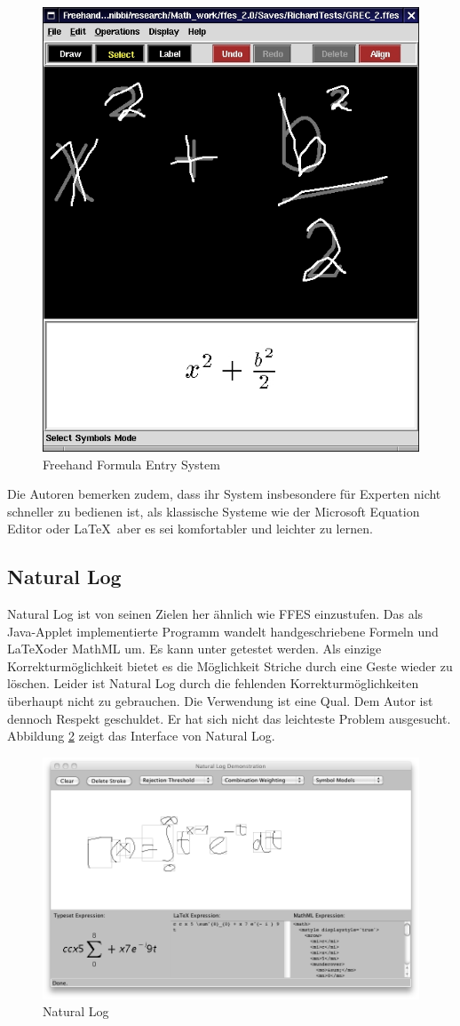 \begin{figure}
  \begin{center}
    \includegraphics[width=.5\textwidth]{figures/ffes.png}
  \end{center}
  \caption{Freehand Formula Entry System}
  \label{fig:ffes}
\end{figure}

Die Autoren bemerken zudem, dass ihr System insbesondere für Experten nicht schneller zu bedienen ist, als klassische Systeme wie der Microsoft Equation Editor oder \LaTeX~aber es sei komfortabler und leichter zu lernen.

\subsection{Natural Log}
\label{sub:natural-log}

Natural Log ist von seinen Zielen her ähnlich wie FFES einzustufen. Das als Java-Applet implementierte Programm wandelt handgeschriebene Formeln und \LaTeX oder MathML um. Es kann unter \cite{natural-log} getestet werden. Als einzige Korrekturmöglichkeit bietet es die Möglichkeit Striche durch eine Geste wieder zu löschen. Leider ist Natural Log durch die fehlenden Korrekturmöglichkeiten überhaupt nicht zu gebrauchen. Die Verwendung ist eine Qual. Dem Autor \citet{Matasakis:1999p9465} ist dennoch Respekt geschuldet. Er hat sich nicht das leichteste Problem ausgesucht. Abbildung \ref{fig:natural-log} zeigt das Interface von Natural Log.

\begin{figure}
  \begin{center}
    \includegraphics[width=.8\textwidth]{figures/natural-log.png}
  \end{center}
  \caption{Natural Log}
  \label{fig:natural-log}
\end{figure}

